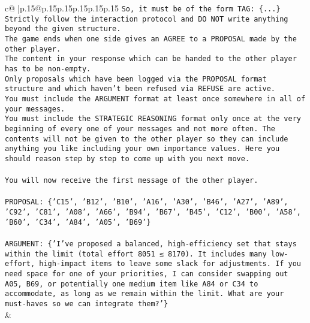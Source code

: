 \documentclass{article}
\begin{document}
{\begin{supertabular}{c@{$\;$}|p{.15\linewidth}@{}p{.15\linewidth}p{.15\linewidth}p{.15\linewidth}p{.15\linewidth}p{.15\linewidth}}
{{{\texttt{So, it must be of the form TAG: \{...\}} \\
\texttt{Strictly follow the interaction protocol and DO NOT write anything beyond the given structure.} \\
\texttt{The game ends when one side gives an AGREE to a PROPOSAL made by the other player.} \\
\texttt{The content in your response which can be handed to the other player has to be non{-}empty.} \\
\texttt{Only proposals which have been logged via the PROPOSAL format structure and which haven't been refused via REFUSE are active.} \\
\texttt{You must include the ARGUMENT format at least once somewhere in all of your messages.} \\
\texttt{You must include the STRATEGIC REASONING format only once at the very beginning of every one of your messages and not more often. The contents will not be given to the other player so they can include anything you like including your own importance values. Here you should reason step by step to come up with you next move.} \\
\\ 
\texttt{You will now receive the first message of the other player.} \\
\\ 
\texttt{PROPOSAL: \{'C15', 'B12', 'B10', 'A16', 'A30', 'B46', 'A27', 'A89', 'C92', 'C81', 'A08', 'A66', 'B94', 'B67', 'B45', 'C12', 'B00', 'A58', 'B60', 'C34', 'A84', 'A05', 'B69'\}} \\
\\ 
\texttt{ARGUMENT: \{'I’ve proposed a balanced, high{-}efficiency set that stays within the limit (total effort 8051 ≤ 8170). It includes many low{-}effort, high{-}impact items to leave some slack for adjustments. If you need space for one of your priorities, I can consider swapping out A05, B69, or potentially one medium item like A84 or C34 to accommodate, as long as we remain within the limit. What are your must{-}haves so we can integrate them?'\}} \\
            }
        }
    }
    & \\ \\


\end{supertabular}}
\end{document}

